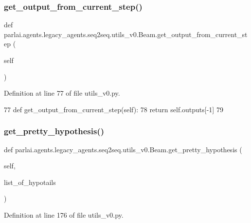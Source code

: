 \subsubsection{\texorpdfstring{get\+\_\+output\+\_\+from\+\_\+current\+\_\+step()}{get\_output\_from\_current\_step()}}
{\footnotesize\ttfamily def parlai.\+agents.\+legacy\+\_\+agents.\+seq2seq.\+utils\+\_\+v0.\+Beam.\+get\+\_\+output\+\_\+from\+\_\+current\+\_\+step (\begin{DoxyParamCaption}\item[{}]{self }\end{DoxyParamCaption})}



Definition at line 77 of file utils\+\_\+v0.\+py.


\begin{DoxyCode}
77     \textcolor{keyword}{def }get\_output\_from\_current\_step(self):
78         \textcolor{keywordflow}{return} self.outputs[-1]
79 
\end{DoxyCode}
\mbox{\label{classparlai_1_1agents_1_1legacy__agents_1_1seq2seq_1_1utils__v0_1_1Beam_a9e16b7ec90640b527d75642fe93c6417}} 
\subsubsection{\texorpdfstring{get\+\_\+pretty\+\_\+hypothesis()}{get\_pretty\_hypothesis()}}
{\footnotesize\ttfamily def parlai.\+agents.\+legacy\+\_\+agents.\+seq2seq.\+utils\+\_\+v0.\+Beam.\+get\+\_\+pretty\+\_\+hypothesis (\begin{DoxyParamCaption}\item[{}]{self,  }\item[{}]{list\+\_\+of\+\_\+hypotails }\end{DoxyParamCaption})}



Definition at line 176 of file utils\+\_\+v0.\+py.


